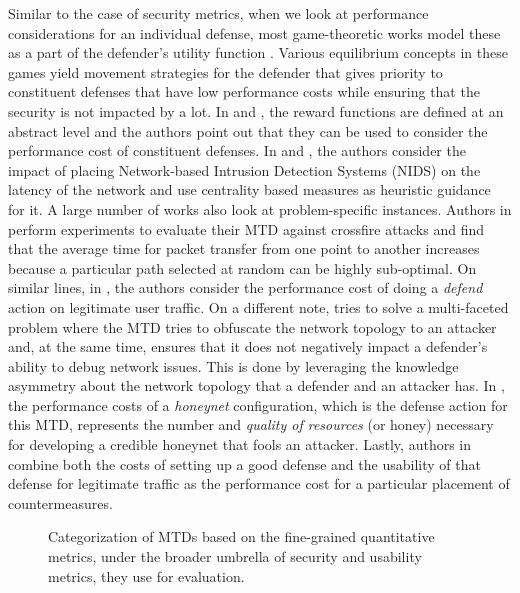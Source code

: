 Similar to the case of security metrics, when we look at performance considerations for an individual defense, most game-theoretic works model these as a part of the defender's utility function . Various equilibrium concepts in these games yield movement strategies for the defender that gives {priority} to constituent {defenses} that have {low performance costs} while ensuring that the security is not impacted by a lot. In  and , the reward functions are defined at an abstract level and the authors point out that they can be used to consider the performance cost of constituent defenses. In  and , the authors consider the impact of placing {Network-based Intrusion Detection Systems} (NIDS) on the {latency} of the network and use {centrality} based measures as {heuristic} guidance for it.
A large number of works also look at problem-specific instances. Authors in  perform experiments to evaluate their MTD against crossfire attacks and find that the average time for packet transfer from one point to another increases because a particular path selected at random can be highly sub-optimal. On similar lines, in , the authors consider the performance cost of doing a {\em defend} action on legitimate user traffic. On a different note,  tries to solve a multi-faceted problem where the MTD tries to {obfuscate} the {network topology} to an attacker and, at the same time, ensures that it {does not negatively impact} a {defender's ability} to debug network issues. This is done by leveraging the knowledge asymmetry about the network topology that a defender and an attacker has. In , the {performance costs} of a  \emph{honeynet} configuration, which is the defense action for this MTD, represents the number and \emph{quality of resources} (or honey) necessary for developing a credible honeynet that fools an attacker. Lastly, authors in  combine both the costs of setting up a good defense and the usability of that defense for legitimate traffic as the performance cost for a particular placement of countermeasures.
\begin{figure}[t]
    \centering
    
    \caption{Categorization of MTDs based on the fine-grained quantitative metrics, under the broader umbrella of security and usability metrics, they use for evaluation.}
    \label{fig:quantitative}
\end{figure}

